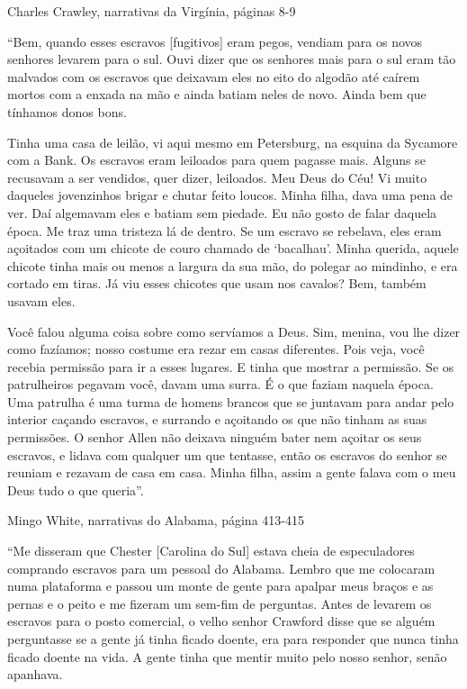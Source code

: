 Charles Crawley, narrativas da Virgínia, páginas 8-9

``Bem, quando esses escravos {[}fugitivos{]} eram pegos, vendiam para os
novos senhores levarem para o sul. Ouvi dizer que os senhores mais para
o sul eram tão malvados com os escravos que deixavam eles no eito do
algodão até caírem mortos com a enxada na mão e ainda batiam neles de
novo. Ainda bem que tínhamos donos bons.

Tinha uma casa de leilão, vi aqui mesmo em Petersburg, na esquina da
Sycamore com a Bank. Os escravos eram leiloados para quem pagasse mais.
Alguns se recusavam a ser vendidos, quer dizer, leiloados. Meu Deus do
Céu! Vi muito daqueles jovenzinhos brigar e chutar feito loucos. Minha
filha, dava uma pena de ver. Daí algemavam eles e batiam sem piedade. Eu
não gosto de falar daquela época. Me traz uma tristeza lá de dentro. Se
um escravo se rebelava, eles eram açoitados com um chicote de couro
chamado de `bacalhau'. Minha querida, aquele chicote tinha mais ou menos
a largura da sua mão, do polegar ao mindinho, e era cortado em tiras. Já
viu esses chicotes que usam nos cavalos? Bem, também usavam eles.

Você falou alguma coisa sobre como servíamos a Deus. Sim, menina, vou
lhe dizer como fazíamos; nosso costume era rezar em casas diferentes.
Pois veja, você recebia permissão para ir a esses lugares. E tinha que
mostrar a permissão. Se os patrulheiros pegavam você, davam uma surra. É
o que faziam naquela época. Uma patrulha é uma turma de homens brancos
que se juntavam para andar pelo interior caçando escravos, e surrando e
açoitando os que não tinham as suas permissões. O senhor Allen não
deixava ninguém bater nem açoitar os seus escravos, e lidava com
qualquer um que tentasse, então os escravos do senhor se reuniam e
rezavam de casa em casa. Minha filha, assim a gente falava com o meu
Deus tudo o que queria''.

Mingo White, narrativas do Alabama, página 413-415

``Me disseram que Chester {[}Carolina do Sul{]} estava cheia de
especuladores comprando escravos para um pessoal do Alabama. Lembro que
me colocaram numa plataforma e passou um monte de gente para apalpar
meus braços e as pernas e o peito e me fizeram um sem-fim de perguntas.
Antes de levarem os escravos para o posto comercial, o velho senhor
Crawford disse que se alguém perguntasse se a gente já tinha ficado
doente, era para responder que nunca tinha ficado doente na vida. A
gente tinha que mentir muito pelo nosso senhor, senão apanhava.

